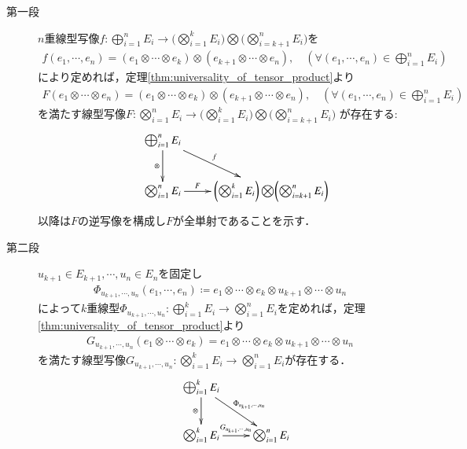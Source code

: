 	\begin{prf}\mbox{}
		\begin{description}
			\item[第一段]
				$n$重線型写像$f:\bigoplus_{i=1}^n E_i \longrightarrow \biggl( \bigotimes_{i=1}^k E_i \biggr) \bigotimes \biggl( \bigotimes_{i=k+1}^n E_i \biggr)$を
				\begin{align}
					f(e_1,\cdots,e_n) = (e_1 \otimes \cdots \otimes e_k) \otimes 
					(e_{k+1} \otimes \cdots \otimes e_n),
					\quad (\forall (e_1,\cdots,e_n) \in \bigoplus_{i=1}^n E_i)
				\end{align}
				により定めれば，定理\ref{thm:universality_of_tensor_product}より
				\begin{align}
					F(e_1 \otimes \cdots \otimes e_n)
					= (e_1 \otimes \cdots \otimes e_k) \otimes 
					(e_{k+1} \otimes \cdots \otimes e_n),
					\quad (\forall (e_1,\cdots,e_n) \in \bigoplus_{i=1}^n E_i)
				\end{align}
				を満たす線型写像$F:\bigotimes_{i=1}^n E_i \longrightarrow \biggl( \bigotimes_{i=1}^k E_i \biggr) \bigotimes \biggl( \bigotimes_{i=k+1}^n E_i \biggr)$
				が存在する:
				\begin{align}
					\xymatrix{
						&\bigoplus_{i=1}^n E_i \ar[d]_-\otimes \ar[rd]^-f & \\
						&\bigotimes_{i=1}^n E_i \ar[r]^-F & \biggl( \bigotimes_{i=1}^k E_i \biggr) \bigotimes \biggl( \bigotimes_{i=k+1}^n E_i \biggr)
					}
				\end{align}
				以降は$F$の逆写像を構成し$F$が全単射であることを示す．
				
			\item[第二段]
				$u_{k+1} \in E_{k+1},\cdots,u_n \in E_n$を固定し
				\begin{align}
					\Phi_{u_{k+1},\cdots,u_n}(e_1,\cdots,e_n)
					\coloneqq e_1 \otimes \cdots \otimes e_k \otimes u_{k+1} \otimes \cdots \otimes u_n
				\end{align}
				によって$k$重線型$\Phi_{u_{k+1},\cdots,u_n}:\bigoplus_{i=1}^k E_i \longrightarrow 
				\bigotimes_{i=1}^n E_i$を定めれば，定理\ref{thm:universality_of_tensor_product}より
				\begin{align}
					G_{u_{k+1},\cdots,u_n}(e_1 \otimes \cdots \otimes e_k)
					= e_1 \otimes \cdots \otimes e_k \otimes u_{k+1} \otimes \cdots \otimes u_n
				\end{align}
				を満たす線型写像$G_{u_{k+1},\cdots,u_n}:\bigotimes_{i=1}^k E_i \longrightarrow 
				\bigotimes_{i=1}^n E_i$が存在する．
				\begin{align}
					\xymatrix{
						&\bigoplus_{i=1}^k E_i \ar[d]_-\otimes \ar[rd]^-{\Phi_{u_{k+1},\cdots,u_n}} & \\
						&\bigotimes_{i=1}^k E_i \ar[r]^-{G_{u_{k+1},\cdots,u_n}} & \bigotimes_{i=1}^n E_i
					}
				\end{align}
			

\end{description}
\end{prf}
